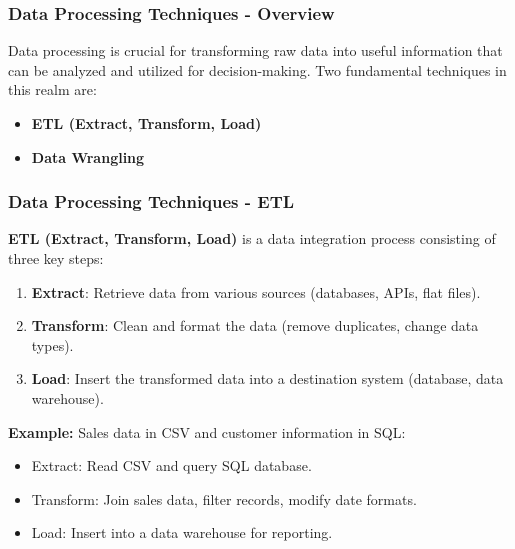 \documentclass[aspectratio=169]{beamer}
\begin{document}
\begin{frame}[fragile]
    \frametitle{Data Processing Techniques - Overview}
    Data processing is crucial for transforming raw data into useful information that can be analyzed and utilized for decision-making. Two fundamental techniques in this realm are:
    \begin{itemize}
        \item \textbf{ETL (Extract, Transform, Load)}
        \item \textbf{Data Wrangling}
    \end{itemize}
\end{frame}

\begin{frame}[fragile]
    \frametitle{Data Processing Techniques - ETL}
    \textbf{ETL (Extract, Transform, Load)} is a data integration process consisting of three key steps:
    \begin{enumerate}
        \item \textbf{Extract}: Retrieve data from various sources (databases, APIs, flat files).
        \item \textbf{Transform}: Clean and format the data (remove duplicates, change data types).
        \item \textbf{Load}: Insert the transformed data into a destination system (database, data warehouse).
    \end{enumerate}
    
    \textbf{Example:} Sales data in CSV and customer information in SQL:
    \begin{itemize}
        \item Extract: Read CSV and query SQL database.
        \item Transform: Join sales data, filter records, modify date formats.
        \item Load: Insert into a data warehouse for reporting.
    \end{itemize}
\end{frame}
\end{document}
